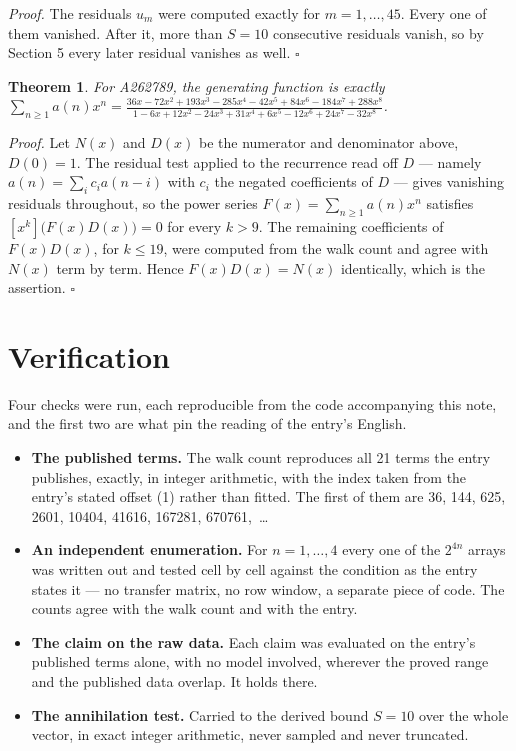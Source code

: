 \documentclass[11pt]{article}
\newtheorem{theorem}{Theorem}
\theoremstyle{definition}
\begin{document}
{\itshape Proof.} The residuals $u_m$ were computed exactly for $m = 1,\dots,45$. Every one of them vanished. After it, more than $S = 10$ consecutive residuals vanish, so by Section 5 every later residual vanishes as well. $\square$

\begin{theorem} For A262789, the generating function is exactly $\sum_{n\ge 1} a(n)x^n = \frac{36x - 72x^{2} + 193x^{3} - 285x^{4} - 42x^{5} + 84x^{6} - 184x^{7} + 288x^{8}}{1 - 6x + 12x^{2} - 24x^{3} + 31x^{4} + 6x^{5} - 12x^{6} + 24x^{7} - 32x^{8}}$.\end{theorem}

{\itshape Proof.} Let $N(x)$ and $D(x)$ be the numerator and denominator above, $D(0)=1$. The residual test applied to the recurrence read off $D$ --- namely $a(n) = \sum_i c_i a(n-i)$ with $c_i$ the negated coefficients of $D$ --- gives vanishing residuals throughout, so the power series $F(x)=\sum_{n\ge 1}a(n)x^n$ satisfies $[x^k]\bigl(F(x)D(x)\bigr) = 0$ for every $k > 9$. The remaining coefficients of $F(x)D(x)$, for $k \le 19$, were computed from the walk count and agree with $N(x)$ term by term. Hence $F(x)D(x) = N(x)$ identically, which is the assertion. $\square$

\section{Verification}

Four checks were run, each reproducible from the code accompanying this note, and the first two are what pin the reading of the entry's English.

\begin{itemize}

\item {\bfseries The published terms.} The walk count reproduces all 21 terms the entry publishes, exactly, in integer arithmetic, with the index taken from the entry's stated offset (1) rather than fitted. The first of them are 36, 144, 625, 2601, 10404, 41616, 167281, 670761,~\dots

\item {\bfseries An independent enumeration.} For $n = 1,\dots,4$ every one of the $2^{4n}$ arrays was written out and tested cell by cell against the condition as the entry states it --- no transfer matrix, no row window, a separate piece of code. The counts agree with the walk count and with the entry.

\item {\bfseries The claim on the raw data.} Each claim was evaluated on the entry's published terms alone, with no model involved, wherever the proved range and the published data overlap. It holds there.

\item {\bfseries The annihilation test.} Carried to the derived bound $S = 10$ over the whole vector, in exact integer arithmetic, never sampled and never truncated.

\end{itemize}
\end{document}
